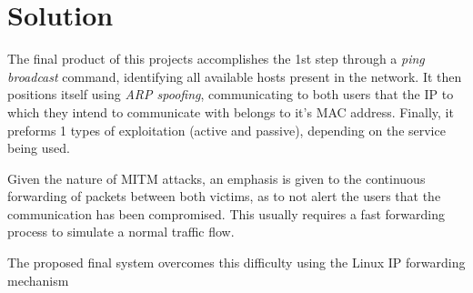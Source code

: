 \section{Solution}

The final product of this projects accomplishes the 1st step through a 
\textit{ping broadcast} command, identifying all available hosts present in the 
network.
It then positions itself using \textit{ARP spoofing}, communicating to both 
users that the IP to which they intend to communicate with belongs to it's MAC 
address. 
Finally, it preforms 1 types of exploitation (active and passive), depending on
the service being used.

Given the nature of MITM attacks, an emphasis is given to the continuous 
forwarding of packets between both victims, as to not alert the users that the 
communication has been compromised.
This usually requires a fast forwarding process to simulate a normal traffic 
flow. 

The proposed final system overcomes this difficulty using the Linux 
IP forwarding mechanism 
